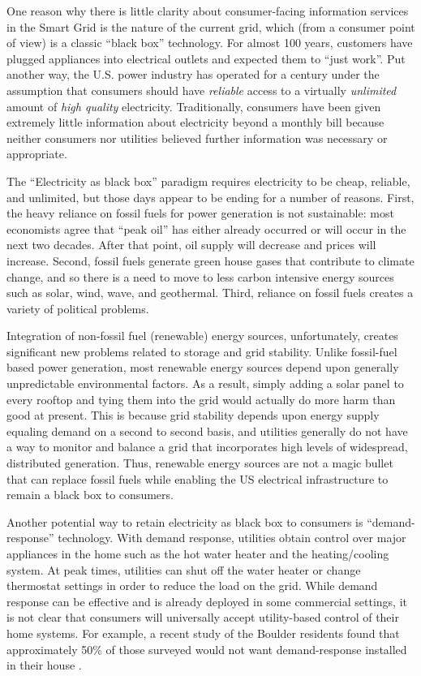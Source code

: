One reason why there is little clarity about consumer-facing information
services in the Smart Grid is the nature of the current grid, which (from a
consumer point of view) is a classic ``black box'' technology.  For almost
100 years, customers have plugged appliances into electrical outlets and
expected them to ``just work''.  Put another way, the U.S. power industry
has operated for a century under the assumption that consumers should have
{\em reliable} access to a virtually {\em unlimited} amount of {\em high
  quality} electricity.  Traditionally, consumers have been given extremely
little information about electricity beyond a monthly bill because neither
consumers nor utilities believed further information was necessary or
appropriate.

The ``Electricity as black box'' paradigm requires electricity to be cheap,
reliable, and unlimited, but those days appear to be ending for a number of
reasons.  First, the heavy reliance on fossil fuels for power generation is
not sustainable: most economists agree that ``peak oil'' has either already
occurred or will occur in the next two decades. After that point, oil
supply will decrease and prices will increase.  Second, fossil fuels
generate green house gases that contribute to climate change, and so there
is a need to move to less carbon intensive energy sources such as solar,
wind, wave, and geothermal.  Third, reliance on fossil fuels creates a
variety of political problems.

Integration of non-fossil fuel (renewable) energy sources, unfortunately,
creates significant new problems related to storage and grid stability.
Unlike fossil-fuel based power generation, most renewable energy sources
depend upon generally unpredictable environmental
factors.  As a result, simply adding a solar panel to every rooftop and
tying them into the grid would actually do more harm than good at present.
This is because grid stability depends upon energy supply equaling demand
on a second to second basis, and utilities generally do not have a way to
monitor and balance a grid that incorporates high levels of widespread,
distributed generation. Thus, renewable energy sources are not a magic
bullet that can replace fossil fuels while enabling the US electrical
infrastructure to remain a black box to consumers.

Another potential way to retain electricity as black box to
consumers is ``demand-response'' technology.  With demand response,
utilities obtain control over major appliances in the home such as the hot
water heater and the heating/cooling system. At peak times, utilities can
shut off the water heater or change thermostat settings in order to reduce
the load on the grid.  While demand response can be effective and is
already deployed in some commercial settings, it is not clear that
consumers will universally accept utility-based control of their home
systems.  For example, a recent study of the Boulder residents found that
approximately 50\% of those surveyed would not want demand-response
installed in their house \cite{Farhar09}.

